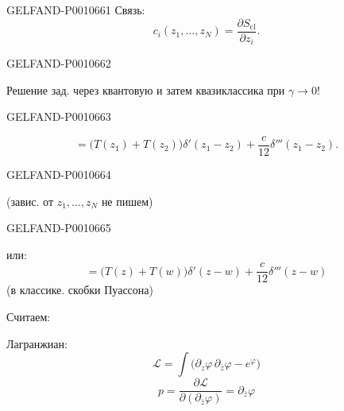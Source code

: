 \begin{GelfandAdjacentEvidence}{GELFAND-P001066}{1}
Связь:
\begin{equation*}
c_i(z_1,\ldots,z_N)=\frac{\partial S_{\mathrm{cl}}}{\partial z_i}.
\tag{14}
\end{equation*}
\end{GelfandAdjacentEvidence}
\begin{GelfandAdjacentEvidence}{GELFAND-P001066}{2}


Решение зад. через квантовую и затем квазиклассика при \(\gamma\to0\)!
\end{GelfandAdjacentEvidence}
\begin{GelfandAdjacentEvidence}{GELFAND-P001066}{3}

\begin{equation*}
[T(z_1),T(z_2)]
  =\bigl(T(z_1)+T(z_2)\bigr)\delta'(z_1-z_2)
   +\frac{c}{12}\delta'''(z_1-z_2).
\tag{15}
\end{equation*}
\end{GelfandAdjacentEvidence}
\begin{GelfandAdjacentEvidence}{GELFAND-P001066}{4}


(завис. от \(z_1,\ldots,z_N\) не пишем)
\end{GelfandAdjacentEvidence}
\begin{GelfandAdjacentEvidence}{GELFAND-P001066}{5}


или:
\begin{equation*}
[T(z),T(w)]
  =\bigl(T(z)+T(w)\bigr)\delta'(z-w)
   +\frac{c}{12}\delta'''(z-w)
\tag{15}
\end{equation*}
(в классике. скобки Пуассона)

Считаем:

Лагранжиан:
\[
\mathcal L=\int\bigl(\partial_z\varphi\,\partial_{\bar z}\varphi-e^\varphi\bigr)
\]
\begin{equation*}
p=\frac{\partial\mathcal L}{\partial(\partial_{\bar z}\varphi)}
  =\partial_{\bar z}\varphi
\tag{16}
\end{equation*}
\end{GelfandAdjacentEvidence}
